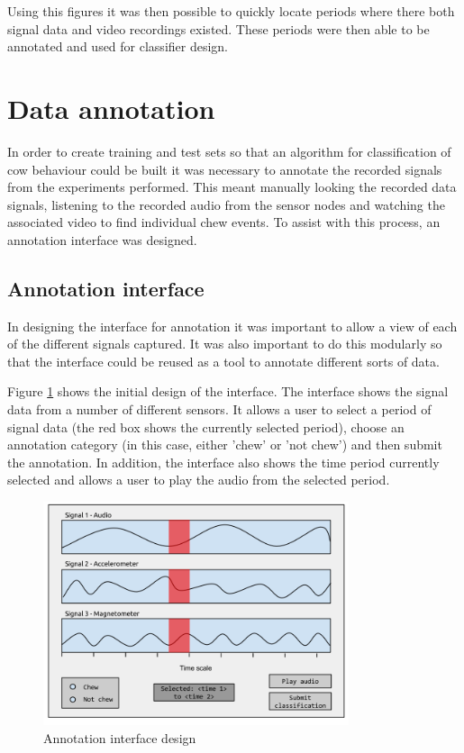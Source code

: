 Using this figures it was then possible to quickly locate periods where there both signal data and video recordings existed. These periods were then able to be annotated and used for classifier design. 


\section{Data annotation}

In order to create training and test sets so that an algorithm for classification of cow behaviour could be built it was necessary to annotate the recorded signals from the experiments performed. This meant manually looking the recorded data signals, listening to the recorded audio from the sensor nodes and watching the associated video to find individual chew events. To assist with this process, an annotation interface was designed. 


\subsection{Annotation interface}

In designing the interface for annotation it was important to allow a view of each of the different signals captured. It was also important to do this modularly so that the interface could be reused as a tool to annotate different sorts of data.

Figure \ref{annotation_interface_design} shows the initial design of the interface. The interface shows the signal data from a number of different sensors. It allows a user to select a period of signal data (the red box shows the currently selected period), choose an annotation category (in this case, either 'chew' or 'not chew') and then submit the annotation. In addition, the interface also shows the time period currently selected and allows a user to play the audio from the selected period. 

\begin{figure}[ht!]
\begin{center}
\leavevmode
\includegraphics[width=0.8\textwidth]{images/annotation_interface_design.png}
\end{center}
\caption{Annotation interface design}
\label{annotation_interface_design}
\end{figure}

